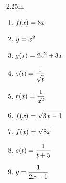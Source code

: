 \begin{adjustwidth*}{}{-2.25in}
\begin{multicols*}{2}
\bmtwo
\begin{enumerate}[1),resume]
\item $\displaystyle f(x) = 8x$
\item $\displaystyle y = x^2$
\item $\displaystyle g(x) = 2x^2 + 3x$
\item $\displaystyle s(t) = \frac{1}{\displaystyle \sqrt{t}}$
\item $\displaystyle r(x) = \frac{1}{x^2}$
\item $\displaystyle f(x) = \displaystyle\sqrt{3x-1}$
\item $\displaystyle f(x) = \displaystyle\sqrt{8x}$
\item $\displaystyle s(t) = \frac{1}{t + 5}$
\item $\displaystyle y = \frac{1}{2x - 1}$
\end{enumerate}
\emtwo

\end{multicols*}
\end{adjustwidth*}
\afterexercises